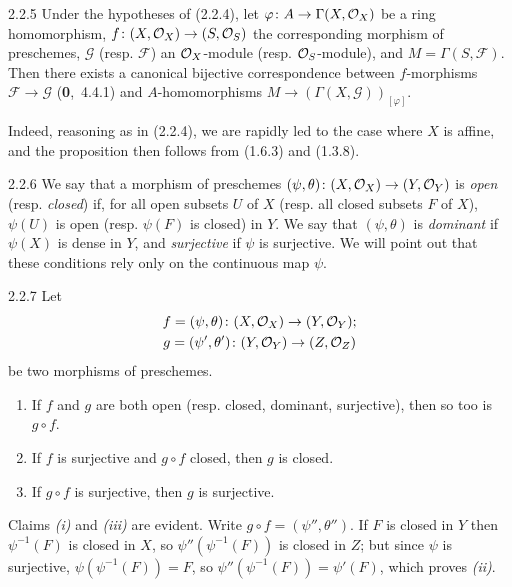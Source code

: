 \documentclass[../main.tex]{subfiles}
\begin{document}
\begin{cx}[Proposition]{2.2.5}
    Under the hypotheses of (2.2.4), let $\varphi\colon A\to\Gamma(X,\mathcal{O}_X)$ be a ring homomorphism, $f\colon(X,\mathcal{O}_X)\to(S,\mathcal{O}_S)$ the corresponding morphism of preschemes, $\mathscr{G}$ (resp. $\mathscr{F}$) an $\mathcal{O}_X$-module (resp. $\mathcal{O}_S$-module), and $M=\Gamma(S,\mathscr{F})$.
    Then there exists a canonical bijective correspondence between $f$-morphisms $\mathscr{F}\to\mathscr{G}$ (\textbf{0},~4.4.1) and $A$-homomorphisms $M\to(\Gamma(X,\mathscr{G}))_{[\varphi]}$.
\end{cx}
Indeed, reasoning as in (2.2.4), we are rapidly led to the case where $X$ is affine, and the proposition then follows from (1.6.3) and (1.3.8).

\begin{cx}{2.2.6}
    We say that a morphism of preschemes $(\psi,\theta)\colon(X,\mathcal{O}_X)\to(Y,\mathcal{O}_Y)$ is \emph{open} (resp. \emph{closed}) if, for all open subsets $U$ of $X$ (resp. all closed subsets $F$ of $X$), $\psi(U)$ is open (resp. $\psi(F)$ is closed) in $Y$.
    We say that $(\psi,\theta)$ is \emph{dominant} if $\psi(X)$ is dense in $Y$, and \emph{surjective} if $\psi$ is surjective.
    We will point out that these conditions rely only on the continuous map $\psi$.
\end{cx}

\begin{cx}[Proposition]{2.2.7}
    Let
    \begin{gather*}
        f=(\psi,\theta)\colon(X,\mathcal{O}_X)\to(Y,\mathcal{O}_Y);\\
        g=(\psi',\theta')\colon(Y,\mathcal{O}_Y)\to(Z,\mathcal{O}_Z)
    \end{gather*}
    be two morphisms of preschemes.
    \begin{enumerate}[label=(\roman*)]
        \item If $f$ and $g$ are both open (resp. closed, dominant, surjective), then so too is $g\circ f$.
        \item If $f$ is surjective and $g\circ f$ closed, then $g$ is closed.
        \item If $g\circ f$ is surjective, then $g$ is surjective.
    \end{enumerate}
\end{cx}
Claims \emph{(i)} and \emph{(iii)} are evident.
Write $g\circ f=(\psi'',\theta'')$.
If $F$ is closed in $Y$ then $\psi^{-1}(F)$ is closed in $X$, so $\psi''(\psi^{-1}(F))$ is closed in $Z$; but since $\psi$ is surjective, $\psi(\psi^{-1}(F))=F$, so $\psi''(\psi^{-1}(F))=\psi'(F)$, which proves \emph{(ii)}.
\end{document}
